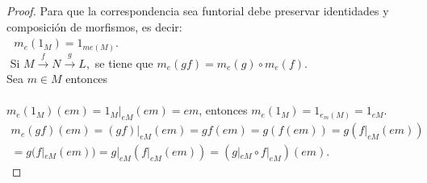 \documentclass{article}
\theoremstyle{definition}
\theoremstyle{plain}
\theoremstyle{plain}
\theoremstyle{definition}
\theoremstyle{definition}
\theoremstyle{definition}
\theoremstyle{definition}
\theoremstyle{definition}
\theoremstyle{definition}
\begin{document}
\begin{enumerate}[label=\textbf{Ej \arabic*.}]
\begin{proof}
 Para que la correspondencia sea funtorial debe preservar identidades y composición de morfismos, es decir:\\

\,\, $m_e(1_M)=1_{me(M)}$.\\
\,\,Si  $ M \stackrel{f}{\longrightarrow} N \stackrel{g}{\longrightarrow} L,$ se tiene que $m_e(gf)=m_e(g)\circ m_e(f)$.\\

Sea $m\in M$ entonces\\

\\
$m_e(1_M)(em)=1_M|_{eM}(em)=em$, entonces $m_e(1_M)=1_{e_m(M)}=1_{eM}.$\\

\begin{gather*}
m_e(gf)(em)=(gf)|_{eM}(em)=gf(em)=g(f(em))=g(f|_{eM}(em))\\
=g(f|_{eM}(em))=g|_{eM}(f|_{eM}(em))=(g|_{eM}\circ f|_{eM})(em).
\end{gather*}
\end{proof}




\end{enumerate}
\end{document}
